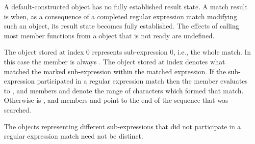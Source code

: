 \pnum
A default-constructed  object has no fully established result state. A
match result is  when, as a consequence of a completed regular expression match
modifying such an object, its result state becomes fully established. The effects of calling
most member functions from a  object that is not ready are undefined.

\pnum
{}%
The  object stored at index 0 represents sub-expression 0,
i.e., the whole match. In this case the  member
 is always . The 
object stored at index  denotes what matched the marked
sub-expression  within the matched expression. If the
sub-expression  participated in a regular expression
match then the  member  evaluates to , and
members  and  denote the range of characters
 which formed that
match. Otherwise  is , and members 
and  point to the end of the sequence
that was searched. \begin{note} The  objects representing
different sub-expressions that did not participate in a regular expression
match need not be distinct.\end{note}

